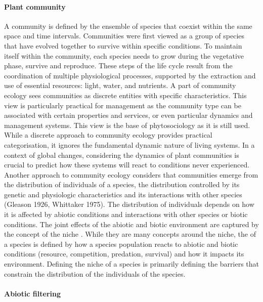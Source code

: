 \paragraph{Plant community}

A community is defined by the ensemble of species that coexist within the same space and time intervals. Communities were first viewed as a group of species that have evolved together to survive within specific conditions. To maintain itself within the community, each species needs to grow during the vegetative phase, survive and reproduce. These steps of the life cycle result from the coordination of multiple physiological processes, supported by the extraction and use of essential resources: light, water, and nutrients. A part of community ecology sees communities as discrete entities with specific characteristics. This view is particularly practical for management as the community type can be associated with certain properties and services, or even particular dynamics and management systems. This view is the base of phytosociology as it is still used. While a discrete approach to community ecology provides practical categorisation, it ignores the fundamental dynamic nature of living systems. In a context of global changes, considering the dynamics of plant communities is crucial to predict how these systems will react to conditions never experienced. Another approach to community ecology considers that communities emerge from the distribution of individuals of a species, the distribution controlled by its genetic and physiologic characteristics and its interactions with other species (Gleason 1926, Whittaker 1975). The distribution of individuals depends on how it is affected by abiotic conditions and interactions with other species or biotic conditions. The joint effects of the abiotic and biotic environment are captured by the concept of the niche \parencite{elton_animal_1971}. While they are many concepts around the niche, the  of a species is defined by how a species population reacts to abiotic and biotic conditions (resource, competition, predation, survival) and how it impacts its environment. Defining the niche of a species is primarily defining the barriers that constrain the distribution of the individuals of the species.



\paragraph{Abiotic filtering}

